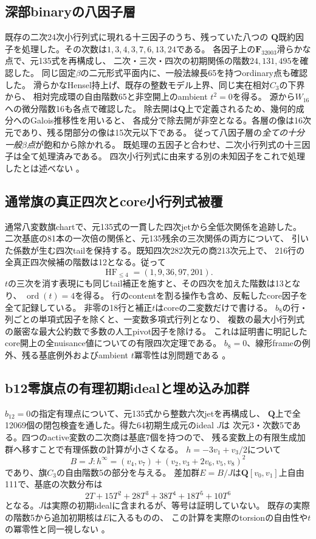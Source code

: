 \documentclass[11pt,a4paper]{ltjsarticle}
\theoremstyle{remark}
\begin{document}
\subsection{深部binaryの八因子層}
既存の二次24次小行列式に現れる十三因子のうち、残っていた八つの
$\mathbf Q$既約因子を処理した。その次数は$1,3,4,3,7,6,13,24$である。
各因子上の$\mathbf F_{32003}$滑らかな点で、元135式を再構成し、
二次・三次・四次の初期関係の階数$24,131,495$を確認した。
同じ固定$\beta$の二元形式平面内に、一般法線長65を持つordinary点も確認した。
滑らかなHensel持上げ、既存の整数モデル上界、同じ実在相対$C_3$の下界から、
相対完成環の自由階数65と非空開上のambient $t^2=0$を得る。
源から$W_{16}$への微分階数16も各点で確認した。
除去開は$\mathbf Q$上で定義されるため、幾何的成分へのGalois推移性を用いると、
各成分で除去開が非空となる。各層の像は16次元であり、残る閉部分の像は15次元以下である。
従って八因子層の\emph{全ての十分一般$\beta$点}が飽和から除かれる。
既処理の五因子と合わせ、二次小行列式の十三因子は全て処理済みである。
四次小行列式に由来する別の未知因子をこれで処理したとは述べない
\cite{deep-artifacts-v49}。

\subsection{通常旗の真正四次とcore小行列式被覆}
通常八変数旗chartで、元135式の一貫した四次jetから全低次関係を追跡した。
二次基底の81本の一次倍の関係と、元135残余の三次関係の両方について、
引いた係数が生む四次tailを保持する。既知四次282次元の商213次元上で、
216行の全真正四次候補の階数は12となる。従って
\[
 \operatorname{HF}_{\le4}=(1,9,36,97,201).
\]
$t$の三次を消す表現にも同じtail補正を施すと、その四次を加えた階数は13となり、
$\operatorname{ord}(t)=4$を得る。
行のcontentを割る操作も含め、反転したcore因子を全て記録している。
非零の18行と補正$t$はcoreの二変数だけで書ける。
$b_8$の行・列ごとの単項式因子を除くと、一変数多項式行列となり、
複数の最大小行列式の厳密な最大公約数で多数の人工pivot因子を除ける。
これは証明書に明記したcore開上の全nuisance値についての有限四次定理である。
$b_8=0$、線形frameの例外、残る基底例外およびambient $t$冪零性は別問題である
\cite{eight-four-v49,eight-cover-v49}。

\subsection{b12零旗点の有理初期idealと埋め込み加群}
$b_{12}=0$の指定有理点について、元135式から整数六次jetを再構成し、
$\mathbf Q$上で全12069個の閉包検査を通した。得た64初期生成元のideal $J$は
次元3・次数5である。四つのactive変数の二次商は基底7個を持つので、
残る変数上の有限生成加群へ移すことで有理係数の計算が小さくなる。
$h=-3v_1+v_3/2$について
\[
 B=J:h^\infty=(v_4,v_7)+(v_2,v_3+2v_6,v_5,v_8)^2
\]
であり、旗$C_3$の自由階数5の部分を与える。
差加群$E=B/J$は$\mathbf Q[v_0,v_1]$上自由111で、基底の次数分布は
\[
 2T+15T^2+28T^3+38T^4+18T^5+10T^6
\]
となる。$J$は実際の初期idealに含まれるが、等号は証明していない。
既存の実際の階数5から追加初期核は$E$に入るものの、
この計算を実際のtorsionの自由性や$t$の冪零性と同一視しない
\cite{zero12-rational-v49}。
\end{document}
